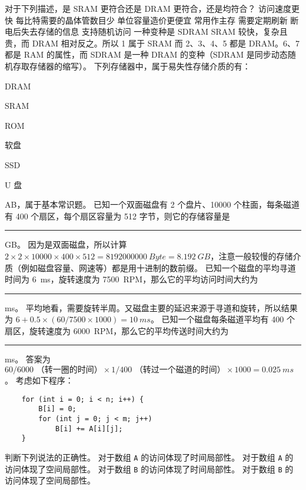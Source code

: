     \begin{problems}
        \pro 对于下列描述，是 SRAM 更符合还是 DRAM 更符合，还是均符合？
            \qn 访问速度更快
            \qn 每比特需要的晶体管数目少
            \qn 单位容量造价更便宜
            \qn 常用作主存
            \qn 需要定期刷新
            \qn 断电后失去存储的信息
            \qn 支持随机访问
            \qn 一种变种是 SDRAM
        \sol SRAM 较快，复杂且贵，而 DRAM 相对反之。所以 1 属于 SRAM 而 2、3、4、5 都是 DRAM。6、7 都是 RAM 的属性，而 SDRAM 是一种 DRAM 的变种（SDRAM 是同步动态随机存取存储器的缩写）。
        \pro 下列存储器中，属于易失性存储介质的有：
            \begin{choices}
                \item DRAM
                \item SRAM
                \item ROM
                \item 软盘
                \item SSD
                \item U 盘
            \end{choices}
        \sol AB，属于基本常识题。
        \pro 已知一个双面磁盘有 2 个盘片、10000 个柱面，每条磁道有 400 个扇区，每个扇区容量为 512 字节，则它的存储容量是 \rule{2.5cm}{0.25mm} GB。
        \sol 因为是双面磁盘，所以计算 $2 \times 2 \times 10000 \times 400 \times 512 = \SI{8192000000}{Byte} = \SI{8.192}{GB}$，注意一般较慢的存储介质（例如磁盘容量、网速等）都是用十进制的数前缀。
        \pro 已知一个磁盘的平均寻道时间为 \SI{6}{ms}，旋转速度为 \SI{7500}{RPM}，那么它的平均访问时间大约为 \rule{2.5cm}{0.25mm} ms。
        \sol 平均地看，需要旋转半周。又磁盘主要的延迟来源于寻道和旋转，所以结果为 $6 + 0.5 \times (60/7500 \times 1000) = \SI{10}{ms}$。
        \pro 已知一个磁盘每条磁道平均有 400 个扇区，旋转速度为 \SI{6000}{RPM}，那么它的平均传送时间大约为 \rule{2.5cm}{0.25mm} ms。
        \sol 答案为 $60/6000 \text{ （转一圈的时间）} \times 1/400 \text{ （转过一个磁道的时间）} \times 1000 = \SI{0.025}{ms}$。
        \pro 考虑如下程序：
        \begin{verbatim}
    for (int i = 0; i < n; i++) {
        B[i] = 0;
        for (int j = 0; j < m; j++)
            B[i] += A[i][j];
    }
        \end{verbatim}
        判断下列说法的正确性。
            \qn 对于数组 \verb|A| 的访问体现了时间局部性。
            \qn 对于数组 \verb|A| 的访问体现了空间局部性。
            \qn 对于数组 \verb|B| 的访问体现了时间局部性。
            \qn 对于数组 \verb|B| 的访问体现了空间局部性。

\end{problems}
